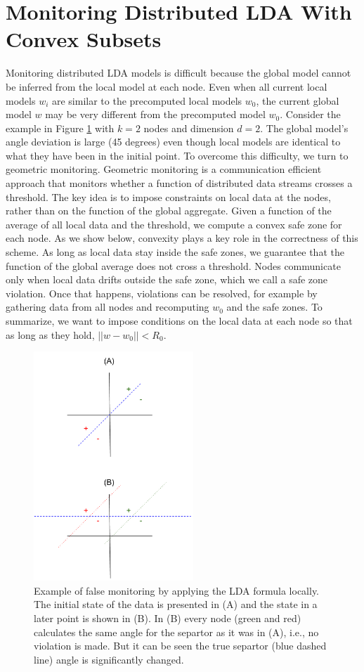 \documentclass[11pt,twocolumn,varwidth=true,a4paper,fleqn]{article}
\begin{document}
\section{Monitoring Distributed LDA With Convex Subsets}
Monitoring distributed LDA models is difficult because the
global model cannot be inferred from the local model at each
node. Even when all current local models $w_i$ are similar to the precomputed
local models $w_0$, the current global model $w$ may
be very different from the precomputed model $w_0$. Consider
the example in Figure \ref{NegativeExampl} with $k = 2$ nodes and dimension $d =
2$. The global model's angle deviation is large (45 degrees) even
though local models are identical to what they have been in the initial point. 
To overcome this difficulty, we turn to geometric monitoring. Geometric monitoring
\cite{keren2014geometric, keren2012shape} is a communication
efficient approach that monitors whether a function of distributed
data streams crosses a threshold. The key idea is to
impose constraints on local data at the nodes, rather than
on the function of the global aggregate. Given a function of
the average of all local data and the threshold, we compute a
convex safe zone for each node. As we show below, convexity
plays a key role in the correctness of this scheme. As long
as local data stay inside the safe zones, we guarantee that
the function of the global average does not cross a threshold.
Nodes communicate only when local data drifts outside the
safe zone, which we call a safe zone violation. Once that
happens, violations can be resolved, for example by gathering
data from all nodes and recomputing $w_0$ and the safe zones.
To summarize, we want to impose conditions on the local
data at each node so that as long as they hold, $||w-w_0||<R_0$.

\begin{figure}[h]
\centering
\includegraphics[width=60mm]{NegativeExample.png}
\caption{Example of false monitoring by applying the LDA formula locally. The
initial state of the data is presented in (A) and the state in a later point
is shown in (B). In (B) every node (green and red) calculates the same angle
for the separtor  as it was in (A), i.e., no violation is made. But it can be
seen the true separtor (blue dashed line) angle is significantly changed.}
\label{NegativeExampl}

\end{figure}
\end{document}
